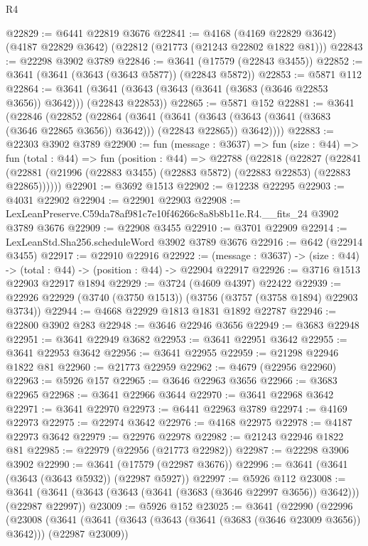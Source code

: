 \begin{lexlean}{R4}
\begin{coremodule}
@22829 := @6441 @22819 @3676
@22841 := @4168
    (@4169 @22829 @3642)
    (@4187 @22829 @3642)
    (@22812 (@21773 (@21243 @22802 @1822 @81)))
@22843 := @22298 @3902 @3789
@22846 := @3641 (@17579 (@22843 @3455))
@22852 := @3641 (@3641 (@3643 (@3643 @5877)) (@22843 @5872))
@22853 := @5871 @112
@22864 := @3641 (@3641 (@3643 (@3643 (@3641 (@3683 (@3646 @22853 @3656)) @3642))) (@22843 @22853))
@22865 := @5871 @152
@22881 := @3641
    (@22846
      (@22852
        (@22864
          (@3641
            (@3641 (@3643 (@3643 (@3641 (@3683 (@3646 @22865 @3656)) @3642))) (@22843 @22865))
            @3642))))
@22883 := @22303 @3902 @3789
@22900 := fun (message : @3637) =>
  fun (size : @44) =>
  fun (total : @44) =>
  fun (position : @44) =>
  @22788
    (@22818
      (@22827
        (@22841 (@22881 (@21996 (@22883 @3455) (@22883 @5872) (@22883 @22853) (@22883 @22865))))))
@22901 := @3692 @1513
@22902 := @12238 @22295
@22903 := @4031 @22902
@22904 := @22901 @22903
@22908 := LexLeanPreserve.C59da78af981c7e10f46266c8a8b8b11e.R4.__fits_24 @3902 @3789 @3676
@22909 := @22908 @3455
@22910 := @3701 @22909
@22914 := LexLeanStd.Sha256.scheduleWord @3902 @3789 @3676
@22916 := @642 (@22914 @3455)
@22917 := @22910 @22916
@22922 := (message : @3637) -> (size : @44) -> (total : @44) -> (position : @44) -> @22904 @22917
@22926 := @3716 @1513 @22903 @22917 @1894
@22929 := @3724 (@4609 @4397) @22422
@22939 := @22926 @22929 (@3740 (@3750 @1513)) (@3756 (@3757 (@3758 @1894) @22903 @3734))
@22944 := @4668 @22929 @1813 @1831 @1892 @22787
@22946 := @22800 @3902 @283
@22948 := @3646 @22946 @3656
@22949 := @3683 @22948
@22951 := @3641 @22949 @3682
@22953 := @3641 @22951 @3642
@22955 := @3641 @22953 @3642
@22956 := @3641 @22955
@22959 := @21298 @22946 @1822 @81
@22960 := @21773 @22959
@22962 := @4679 (@22956 @22960)
@22963 := @5926 @157
@22965 := @3646 @22963 @3656
@22966 := @3683 @22965
@22968 := @3641 @22966 @3644
@22970 := @3641 @22968 @3642
@22971 := @3641 @22970
@22973 := @6441 @22963 @3789
@22974 := @4169 @22973
@22975 := @22974 @3642
@22976 := @4168 @22975
@22978 := @4187 @22973 @3642
@22979 := @22976 @22978
@22982 := @21243 @22946 @1822 @81
@22985 := @22979 (@22956 (@21773 @22982))
@22987 := @22298 @3906 @3902
@22990 := @3641 (@17579 (@22987 @3676))
@22996 := @3641 (@3641 (@3643 (@3643 @5932)) (@22987 @5927))
@22997 := @5926 @112
@23008 := @3641 (@3641 (@3643 (@3643 (@3641 (@3683 (@3646 @22997 @3656)) @3642))) (@22987 @22997))
@23009 := @5926 @152
@23025 := @3641
    (@22990
      (@22996
        (@23008
          (@3641
            (@3641 (@3643 (@3643 (@3641 (@3683 (@3646 @23009 @3656)) @3642))) (@22987 @23009))

\end{coremodule}
\end{lexlean}
